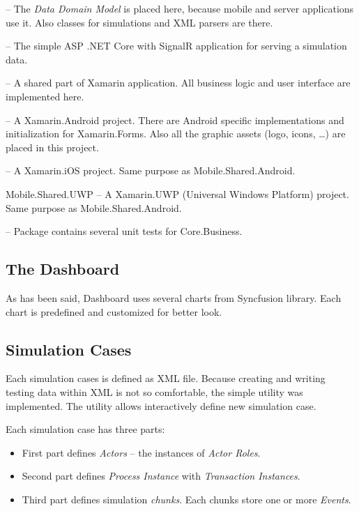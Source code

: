 \begin{description}
\item[Core.Business] -- The \textit{Data Domain Model} is placed here, because mobile and server applications use it. Also classes for simulations and XML parsers are there.
\item[Server] -- The simple ASP .NET Core with SignalR application for serving a simulation data.
\item[Mobile.Shared] -- A shared part of Xamarin application. All business logic and user interface are implemented here.
\item[Mobile.Shared.Android] -- A Xamarin.Android project. There are Android specific implementations and initialization for Xamarin.Forms. Also all the graphic assets (logo, icons, \dots) are placed in this project.
\item[Mobile.Shared.iOS] -- A Xamarin.iOS project. Same purpose as Mobile.Shared.Android.
\item{Mobile.Shared.UWP} -- A Xamarin.UWP (Universal Windows Platform) project. Same purpose as Mobile.Shared.Android.
\item[Tests] -- Package contains several unit tests for Core.Business. 
\end{description}
\subsection{The Dashboard}
As has been said, Dashboard uses several charts from Syncfusion library. Each chart is predefined and customized for better look. 
\subsection{Simulation Cases}
Each simulation cases is defined as XML file. Because creating and writing testing data within XML is not so comfortable, the simple utility was implemented. The utility allows interactively define new simulation case.

Each simulation case has three parts:
\begin{itemize}
\item First part defines \textit{Actors} -- the instances of \textit{Actor Roles}.
\item Second part defines \textit{Process Instance} with \textit{Transaction Instances}.
\item Third part defines simulation \textit{chunks}. Each chunks store one or more \textit{Events}.
\end{itemize}

